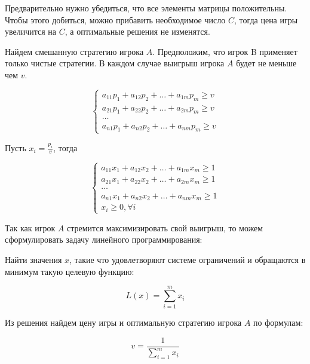 \documentclass[11pt, a4paper]{article}
\begin{document}
    Предварительно нужно убедиться, что все элементы матрицы положительны.
    Чтобы этого добиться, можно прибавить необходимое число $C$, тогда цена игры увеличится на $C$,
    а оптимальные решения не изменятся.

    Найдем смешанную стратегию игрока $A$.
    Предположим, что игрок B применяет только чистые стратегии.
    В каждом случае выигрыш игрока $A$ будет не меньше чем $v$.

    \begin{equation}
        \begin{cases}
            a_{11}p_1 + a_{12}p_2 + \dots + a_{1m}p_m \ge v\\
            a_{21}p_1 + a_{22}p_2 + \dots + a_{2m}p_m \ge v\\
            \dots\\
            a_{n1}p_1 + a_{n2}p_2 + \dots + a_{nm}p_m \ge v
        \end{cases}\label{eq:equation4}
    \end{equation}

    Пусть $x_i = \frac{p_i}{v}$, тогда

    \begin{equation}
        \begin{cases}
            a_{11}x_1 + a_{12}x_2 + \dots + a_{1m}x_m \ge 1\\
            a_{21}x_1 + a_{22}x_2 + \dots + a_{2m}x_m \ge 1\\
            \dots\\
            a_{n1}x_1 + a_{n2}x_2 + \dots + a_{nm}x_m \ge 1\\
            x_i \ge 0, \forall i
        \end{cases}\label{eq:equation5}
    \end{equation}

    Так как игрок $A$ стремится максимизировать свой выигрыш, то можем
    сформулировать задачу линейного программирования:

    Найти значения $x$, такие что удовлетворяют системе ограничений
    и обращаются в минимум такую целевую функцию:

    \begin{equation}
        L(x) = \sum_{i=1}^m x_i\label{eq:equation6}
    \end{equation}

    Из решения найдем цену игры и оптимальную стратегию игрока $A$
    по формулам:

    \begin{equation}
        v = \frac{1}{\sum_{i=1}^m x_i}\label{eq:equation7}
    \end{equation}
\end{document}
